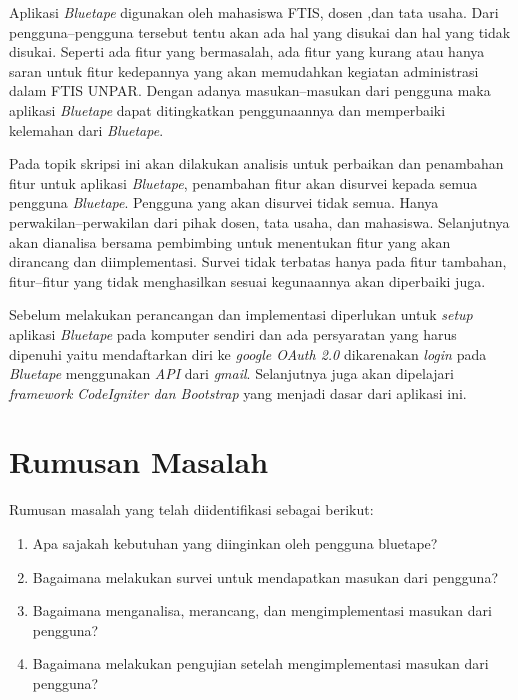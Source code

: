 Aplikasi \textit{Bluetape} digunakan oleh mahasiswa FTIS, dosen ,dan tata usaha. Dari pengguna--pengguna tersebut tentu akan ada hal yang disukai dan hal yang tidak disukai. Seperti ada fitur yang bermasalah, ada fitur yang kurang atau hanya saran untuk fitur kedepannya yang akan memudahkan kegiatan administrasi dalam FTIS UNPAR. Dengan adanya masukan--masukan dari pengguna maka aplikasi \textit{Bluetape} dapat ditingkatkan penggunaannya dan memperbaiki kelemahan dari \textit{Bluetape}.

Pada topik skripsi ini akan dilakukan analisis untuk perbaikan dan penambahan fitur untuk aplikasi \textit{Bluetape}, penambahan fitur akan disurvei kepada semua pengguna \textit{Bluetape}. Pengguna yang akan disurvei tidak semua. Hanya perwakilan--perwakilan dari pihak dosen, tata usaha, dan mahasiswa. Selanjutnya akan dianalisa bersama pembimbing untuk menentukan fitur yang akan dirancang dan diimplementasi. Survei tidak terbatas hanya pada fitur tambahan, fitur--fitur yang tidak menghasilkan sesuai kegunaannya akan diperbaiki juga.


Sebelum melakukan perancangan dan implementasi diperlukan untuk \textit{setup} aplikasi \textit{Bluetape} pada komputer sendiri dan ada persyaratan yang harus dipenuhi yaitu mendaftarkan diri ke \textit{google OAuth 2.0} dikarenakan \textit{login} pada \textit{Bluetape} menggunakan \textit{API} dari \textit{gmail}. Selanjutnya juga akan dipelajari \textit{framework CodeIgniter dan Bootstrap} yang menjadi dasar dari aplikasi ini. 

\section{Rumusan Masalah}
\label{sec:rumusan}
Rumusan masalah yang telah diidentifikasi sebagai berikut:
\begin{enumerate}
	\item Apa sajakah kebutuhan yang diinginkan oleh pengguna bluetape?
	\item Bagaimana melakukan survei untuk mendapatkan masukan dari pengguna?
	\item Bagaimana menganalisa, merancang, dan mengimplementasi masukan dari pengguna?
	\item Bagaimana melakukan pengujian setelah mengimplementasi masukan dari pengguna?

\end{enumerate}

